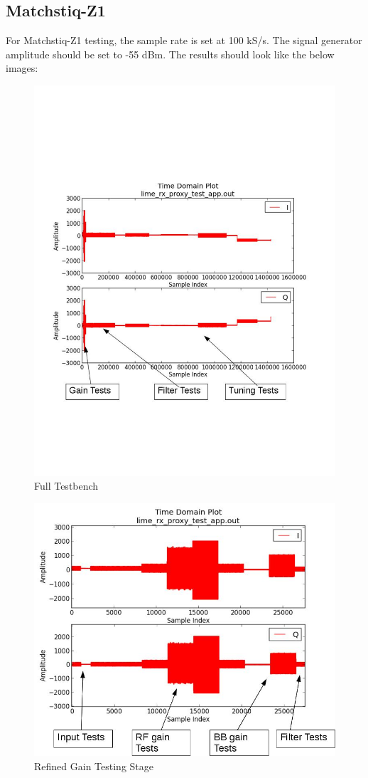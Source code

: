 \documentclass{article}
\begin{document}
\subsection*{Matchstiq-Z1}
For Matchstiq-Z1 testing, the sample rate is set at 100 kS/s. The signal generator amplitude should be set to -55 dBm.
The results should look like the below images:
\begin{figure}[ht]
	\centerline{\includegraphics[scale=0.5]{lime_RX_big_testbench}}
	\caption{Full Testbench}
\end{figure}
\begin{figure}[ht]
	\centerline{\includegraphics[scale=0.5]{lime_RX_small_testbench}}
	\caption{Refined Gain Testing Stage}
\end{figure}
\newpage
\end{document}
